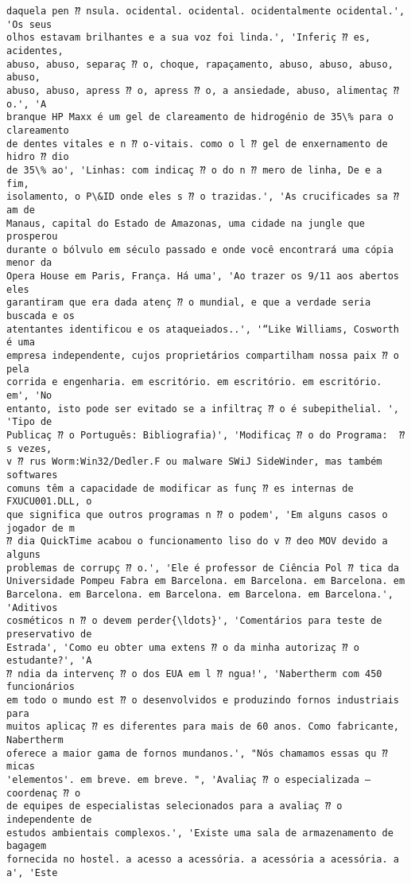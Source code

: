 \documentclass[10pt]{article}
\begin{document}
\begin{Verbatim}[commandchars=\\\{\}]
daquela pen ⁇ nsula. ocidental. ocidental. ocidentalmente ocidental.', 'Os seus
olhos estavam brilhantes e a sua voz foi linda.', 'Inferiç ⁇ es, acidentes,
abuso, abuso, separaç ⁇ o, choque, rapaçamento, abuso, abuso, abuso, abuso,
abuso, abuso, apress ⁇ o, apress ⁇ o, a ansiedade, abuso, alimentaç ⁇ o.', 'A
branque HP Maxx é um gel de clareamento de hidrogénio de 35\% para o clareamento
de dentes vitales e n ⁇ o-vitais. como o l ⁇ gel de enxernamento de hidro ⁇ dio
de 35\% ao', 'Linhas: com indicaç ⁇ o do n ⁇ mero de linha, De e a fim,
isolamento, o P\&ID onde eles s ⁇ o trazidas.', 'As crucificades sa ⁇ am de
Manaus, capital do Estado de Amazonas, uma cidade na jungle que prosperou
durante o bólvulo em século passado e onde você encontrará uma cópia menor da
Opera House em Paris, França. Há uma', 'Ao trazer os 9/11 aos abertos eles
garantiram que era dada atenç ⁇ o mundial, e que a verdade seria buscada e os
atentantes identificou e os ataqueiados..', '“Like Williams, Cosworth é uma
empresa independente, cujos proprietários compartilham nossa paix ⁇ o pela
corrida e engenharia. em escritório. em escritório. em escritório. em', 'No
entanto, isto pode ser evitado se a infiltraç ⁇ o é subepithelial. ', 'Tipo de
Publicaç ⁇ o Português: Bibliografia)', 'Modificaç ⁇ o do Programa:  ⁇ s vezes,
v ⁇ rus Worm:Win32/Dedler.F ou malware SWiJ SideWinder, mas também softwares
comuns têm a capacidade de modificar as funç ⁇ es internas de FXUCU001.DLL, o
que significa que outros programas n ⁇ o podem', 'Em alguns casos o jogador de m
⁇ dia QuickTime acabou o funcionamento liso do v ⁇ deo MOV devido a alguns
problemas de corrupç ⁇ o.', 'Ele é professor de Ciência Pol ⁇ tica da
Universidade Pompeu Fabra em Barcelona. em Barcelona. em Barcelona. em
Barcelona. em Barcelona. em Barcelona. em Barcelona. em Barcelona.', 'Aditivos
cosméticos n ⁇ o devem perder{\ldots}', 'Comentários para teste de preservativo de
Estrada', 'Como eu obter uma extens ⁇ o da minha autorizaç ⁇ o estudante?', 'A
⁇ ndia da intervenç ⁇ o dos EUA em l ⁇ ngua!', 'Nabertherm com 450 funcionários
em todo o mundo est ⁇ o desenvolvidos e produzindo fornos industriais para
muitos aplicaç ⁇ es diferentes para mais de 60 anos. Como fabricante, Nabertherm
oferece a maior gama de fornos mundanos.', "Nós chamamos essas qu ⁇ micas
'elementos'. em breve. em breve. ", 'Avaliaç ⁇ o especializada – coordenaç ⁇ o
de equipes de especialistas selecionados para a avaliaç ⁇ o independente de
estudos ambientais complexos.', 'Existe uma sala de armazenamento de bagagem
fornecida no hostel. a acesso a acessória. a acessória a acessória. a a', 'Este

\end{Verbatim}
\end{document}
